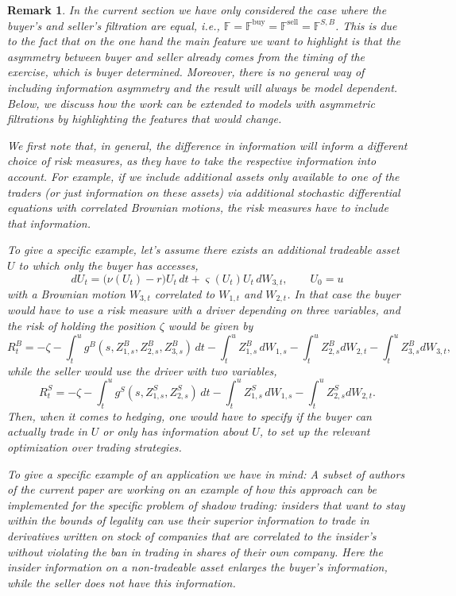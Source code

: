 \documentclass{article}
\newtheorem{remark}[definition]{Remark}
\begin{document}
\begin{remark}\label{rem:specifiv}
In the current section we have only considered the case where the buyer's and seller's filtration are equal, i.e., $\mathbb{F} = \mathbb{F}^{\text{buy}} = \mathbb{F}				^{\text{sell}} = \mathbb{F}^{S,B}$. This is due to the fact that on the one hand the main feature we want to highlight is that the asymmetry between buyer and seller already comes from the timing of the exercise, which is buyer determined. Moreover, there is no general way of including information asymmetry and the result will always be model dependent. Below, we discuss how the work can be extended to models with asymmetric filtrations by highlighting the features that would change. 

We first note that, in general, the difference in information will inform a different choice of risk measures, as they have to take the respective information into account. For example, if we include additional assets only available to one of the traders (or just information on these assets) via additional stochastic differential equations with correlated Brownian motions, the risk measures have to include that information.

To give a specific example, let's assume there exists an additional tradeable asset $U$ to which only the buyer has accesses, 
\[
	dU_t = \bigl(\nu(U_t) -r\bigr) U_t \, dt + \varsigma(U_t) U_t \, dW_{3,t}, \qquad U_0 =u
\] 
with a Brownian motion $W_{3,t}$ correlated to $W_{1,t}$ and $W_{2,t}$. In that case the buyer would have to use a risk measure with a driver depending on three variables, and the risk of holding the position $\zeta$ would be given by
\begin{equation*}
	R^B_{t} = -\zeta - \int_t^u g^B(s, Z^B_{1,s},Z^B_{2,s}, Z^B_{3,s})\,dt - \int_t^u Z^B_{1,s}\,dW_{1,s} -\int_t^u Z^B_{2,s}dW_{2,t} -\int_t^u Z^B_{3,s}dW_{3,t},
\end{equation*}
while the seller would use the driver with two variables,
\begin{equation*}
	R^S_{t} = -\zeta - \int_t^u g^S(s, Z^S_{1,s},Z^S_{2,s})\,dt - \int_t^u Z^S_{1,s}\,dW_{1,s} -\int_t^u Z^S_{2,s}dW_{2,t}.
\end{equation*}
Then, when it comes to hedging, one would have to specify if the buyer can actually trade in $U$ or only has information about $U$, to set up the relevant optimization over trading strategies.
 
To give a specific example of an application we have in mind: A subset of authors of the current paper are working on an example of how this approach can be implemented for the specific problem of shadow trading: insiders that want to stay within the bounds of legality can use their superior information to trade in derivatives written on stock of companies that are correlated to the insider's without violating the ban in trading in shares of their own company. Here the insider information on a non-tradeable asset enlarges the buyer's information, while the seller does not have this information.
\end{remark}
\end{document}
